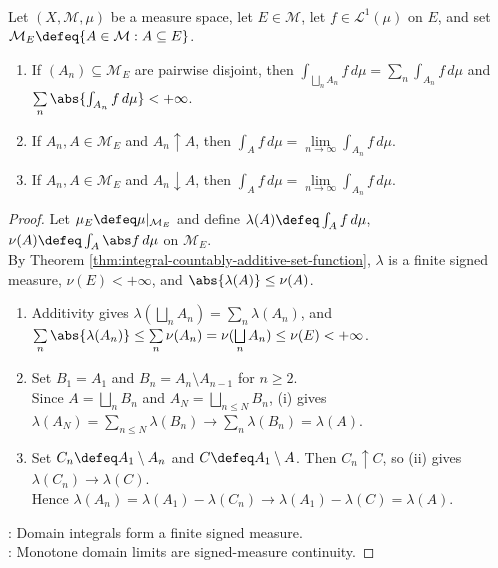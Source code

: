 \begin{corollary} \label{cor:integration-countable-additivity-and-continuity-over-domains} \\
Let $(X,\mathcal{M},\mu)$ be a measure space, let $E\in\mathcal{M}$, let $f\in\mathscr{L}^1(\mu)$ on $E$, and set $\mathcal{M}_E\defeq\{A\in\mathcal{M}:A\subseteq E\}$.
\begin{enumerate}[label=(\roman*)]
\setlength{\itemsep}{0pt}
\item If $(A_n)\subseteq\mathcal{M}_E$ are pairwise disjoint, then $\int_{\bigsqcup\limits_nA_n}f\,d\mu=\sum\limits_n\int_{A_n}f\,d\mu$ and $\sum\limits_n\abs{\int_{A_n}f\,d\mu}<+\infty$.
\item If $A_n,A\in\mathcal{M}_E$ and $A_n\uparrow A$, then $\int_Af\,d\mu=\lim\limits_{n\to\infty}\int_{A_n}f\,d\mu$.
\item If $A_n,A\in\mathcal{M}_E$ and $A_n\downarrow A$, then $\int_Af\,d\mu=\lim\limits_{n\to\infty}\int_{A_n}f\,d\mu$.
\end{enumerate}
\begin{proof} Let $\mu_E\defeq\mu|_{\mathcal{M}_E}$ and define $\lambda(A)\defeq\int_Af\,d\mu$, $\nu(A)\defeq\int_A\abs f\,d\mu$ on $\mathcal{M}_E$.\\
By Theorem \ref{thm:integral-countably-additive-set-function}, $\lambda$ is a finite signed measure, $\nu(E)<+\infty$, and $\abs{\lambda(A)}\leq\nu(A)$.
\begin{enumerate}[label=(\roman*)]
\setlength{\itemsep}{0pt}
\item Additivity gives $\lambda(\bigsqcup\limits_nA_n)=\sum\limits_n\lambda(A_n)$, and $\sum\limits_n\abs{\lambda(A_n)}\leq\sum\limits_n\nu(A_n)=\nu(\bigsqcup\limits_nA_n)\leq\nu(E)<+\infty$.
\item Set $B_1=A_1$ and $B_n=A_n\setminus A_{n-1}$ for $n\geq2$.\\
Since $A=\bigsqcup\limits_nB_n$ and $A_N=\bigsqcup\limits_{n\leq N}B_n$, (i) gives $\lambda(A_N)=\sum\limits_{n\leq N}\lambda(B_n)\to\sum\limits_n\lambda(B_n)=\lambda(A)$.
\item Set $C_n\defeq A_1\setminus A_n$ and $C\defeq A_1\setminus A$. Then $C_n\uparrow C$, so (ii) gives $\lambda(C_n)\to\lambda(C)$.\\
Hence $\lambda(A_n)=\lambda(A_1)-\lambda(C_n)\to\lambda(A_1)-\lambda(C)=\lambda(A)$.
\end{enumerate}
: Domain integrals form a finite signed measure.\\
: Monotone domain limits are signed-measure continuity.
\end{proof}
\end{corollary}

